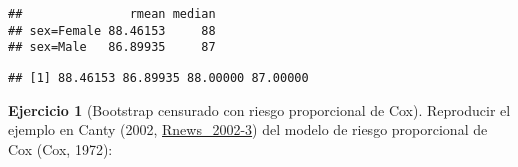 \documentclass[
]{book}
\newenvironment{Shaded}{\begin{snugshade}}{\end{snugshade}}
\newcommand{\AttributeTok}[1]{\textcolor[rgb]{0.77,0.63,0.00}{#1}}
\newcommand{\CommentTok}[1]{\textcolor[rgb]{0.56,0.35,0.01}{\textit{#1}}}
\newcommand{\DecValTok}[1]{\textcolor[rgb]{0.00,0.00,0.81}{#1}}
\newcommand{\FunctionTok}[1]{\textcolor[rgb]{0.00,0.00,0.00}{#1}}
\newcommand{\NormalTok}[1]{#1}
\newcommand{\OtherTok}[1]{\textcolor[rgb]{0.56,0.35,0.01}{#1}}
\newcommand{\SpecialCharTok}[1]{\textcolor[rgb]{0.00,0.00,0.00}{#1}}
\newcommand{\StringTok}[1]{\textcolor[rgb]{0.31,0.60,0.02}{#1}}
\theoremstyle{break}
\theoremstyle{definition}
\theoremstyle{definition}
\theoremstyle{definition}
\newtheorem{exercise}{Ejercicio}[chapter]
\theoremstyle{definition}
\theoremstyle{remark}
\begin{document}
\begin{Shaded}
\end{Shaded}

\begin{verbatim}
##               rmean median
## sex=Female 88.46153     88
## sex=Male   86.89935     87
\end{verbatim}

\begin{Shaded}
\end{Shaded}

\begin{verbatim}
## [1] 88.46153 86.89935 88.00000 87.00000
\end{verbatim}

\begin{exercise}[Bootstrap censurado con riesgo proporcional de Cox]
\protect\hypertarget{exr:censboot-cox-ej}{}{\label{exr:censboot-cox-ej} \iffalse (Bootstrap censurado con riesgo proporcional de Cox) \fi{} }
Reproducir el ejemplo en Canty (2002, \href{http://cran.fhcrc.org/doc/Rnews/Rnews_2002-3.pdf}{Rnews\_2002-3}) del modelo de riesgo proporcional de Cox (Cox, 1972):
\end{exercise}

\begin{Shaded}
\end{Shaded}
\end{document}
